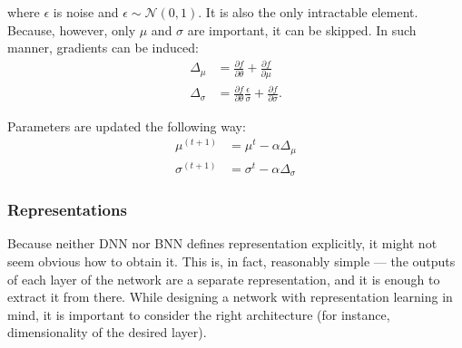 \noindent where $\epsilon$ is noise and $\epsilon \sim \mathcal{N}(0, 1)$. It is also the only intractable element. Because, however, only $\mu$ and $\sigma$ are important, it can be skipped. In such manner, gradients can be induced:
\begin{align}
    \Delta_\mu &= \frac{\partial f}{\partial \theta} + \frac{\partial f}{\partial \mu} \\
    \Delta_\sigma &= \frac{\partial f}{\partial \theta} \frac{\epsilon}{\sigma} + \frac{\partial f}{\partial \sigma}.
\end{align}

\noindent Parameters are updated the following way:
\begin{align}
    \mu^{(t+1)} &= \mu^{t} - \alpha \Delta_\mu \\
    \sigma^{(t+1)} &= \sigma^t - \alpha \Delta_\sigma
\end{align}

\subsubsection{Representations}
Because neither DNN nor BNN defines representation explicitly, it might not seem obvious how to obtain it. This is, in fact, reasonably simple — the outputs of each layer of the network are a separate representation, and it is enough to extract it from there. While designing a network with representation learning in mind, it is important to consider the right architecture (for instance, dimensionality of the desired layer).


